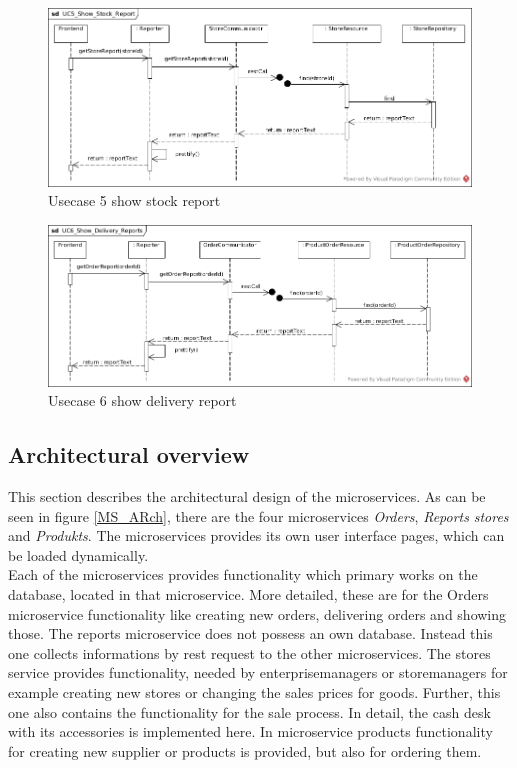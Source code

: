 			\begin{figure}[!h]
				\centering
				\includegraphics[width = 1\textwidth]{img/UC5_Show_Stock_Report.jpg}
				\caption{Usecase 5 show stock report}
				\label{MS_UC5}
			\end{figure}
			
			\begin{figure}[!h]
				\centering
				\includegraphics[width = 1\textwidth]{img/UC6_Show_Delivery_Reports.jpg}
				\caption{Usecase 6 show delivery report}
				\label{MS_UC6}
			\end{figure}
			
	\FloatBarrier
	\subsection{Architectural overview}	\label{archiOverviewMicro}	
	This section describes the architectural design of the microservices. As can be seen in figure \ref{MS_ARch}, there are the four microservices \textit{Orders}, \textit{Reports} \textit{stores} and \textit{Produkts}. The microservices provides its own user interface pages, which can be loaded dynamically. \\
	Each of the microservices provides functionality which primary works on the database, located in that microservice. More detailed, these are for the Orders microservice functionality like creating new orders, delivering orders and showing those. The reports microservice does not possess an own database. Instead this one collects informations by rest request to the other microservices. The stores service provides functionality, needed by enterprisemanagers or storemanagers for example creating new stores or changing the sales prices for goods. Further, this one also contains the functionality for the sale process. In detail, the cash desk with its accessories is implemented here. In microservice products functionality for creating new supplier or products is provided, but also for ordering them.
	
